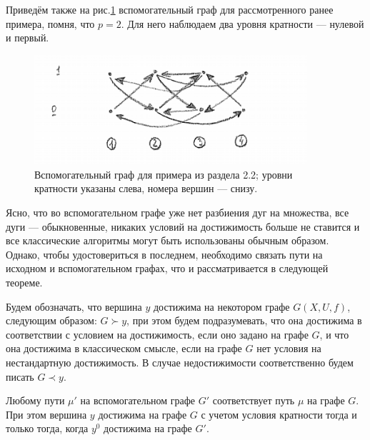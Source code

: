 Приведём также на рис.\ref{fig:pic_3} вспомогательный граф для рассмотренного ранее примера, помня, что $p = 2$. Для него наблюдаем два уровня кратности --- нулевой и первый.

\begin{figure}
	\centering
	{\includegraphics[width=0.9\textwidth]{img/3.png}}
	{Вспомогательный граф для примера из раздела 2.2; уровни кратности указаны слева, номера вершин --- снизу.}
	\label{fig:pic_3}
\end{figure}

Ясно, что во вспомогательном графе уже нет разбиения дуг на множества, все дуги --- обыкновенные, никаких условий на достижимость больше не ставится и все классические алгоритмы могут быть использованы обычным образом. Однако, чтобы удостовериться в последнем, необходимо связать пути на исходном и вспомогательном графах, что и рассматривается в следующей теореме. 

\begin{definition}
	Будем обозначать, что вершина $y$ достижима на некотором графе $G(X,U,f)$, следующим образом: $G \succ y$, при этом будем подразумевать, что она достижима в соответствии с условием на достижимость, если оно задано на графе $G$, и что она достижима в классическом смысле, если на графе $G$ нет условия на нестандартную достижимость.
	В случае недостижимости соответственно будем писать $G \prec y$.
\end{definition}

\begin{theorem}
	Любому пути $\mu'$ на вспомогательном графе $G'$ соответствует путь $\mu$ на графе $G$. При этом вершина $y$ достижима на графе $G$ с учетом условия кратности тогда и только тогда, когда $y^0$ достижима на графе $G'$. 
\end{theorem}

